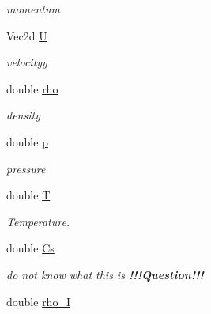 \begin{CompactItemize}
\begin{CompactList}\small\item\em momentum \item\end{CompactList}\item 
\hypertarget{classParticle_f931f3625b557b51cca6b199dc1f3e95}{
Vec2d \hyperlink{classParticle_f931f3625b557b51cca6b199dc1f3e95}{U}}
\label{classParticle_f931f3625b557b51cca6b199dc1f3e95}

\begin{CompactList}\small\item\em velocityy \item\end{CompactList}\item 
\hypertarget{classParticle_4a4fc6e753e74eac9d7725c431e94205}{
double \hyperlink{classParticle_4a4fc6e753e74eac9d7725c431e94205}{rho}}
\label{classParticle_4a4fc6e753e74eac9d7725c431e94205}

\begin{CompactList}\small\item\em density \item\end{CompactList}\item 
\hypertarget{classParticle_9ef797ea4feb5eed21755d5d8e99508e}{
double \hyperlink{classParticle_9ef797ea4feb5eed21755d5d8e99508e}{p}}
\label{classParticle_9ef797ea4feb5eed21755d5d8e99508e}

\begin{CompactList}\small\item\em pressure \item\end{CompactList}\item 
\hypertarget{classParticle_b07ac93118d84bc548e0dc837a5c31f5}{
double \hyperlink{classParticle_b07ac93118d84bc548e0dc837a5c31f5}{T}}
\label{classParticle_b07ac93118d84bc548e0dc837a5c31f5}

\begin{CompactList}\small\item\em Temperature. \item\end{CompactList}\item 
\hypertarget{classParticle_04aaaa78c93a52103d092923287d79ae}{
double \hyperlink{classParticle_04aaaa78c93a52103d092923287d79ae}{Cs}}
\label{classParticle_04aaaa78c93a52103d092923287d79ae}

\begin{CompactList}\small\item\em do not know what this is {\bf !!!Question!!!} \item\end{CompactList}\item 
\hypertarget{classParticle_c9af22c35c1bf1c33ae8145b0ec3a631}{
double \hyperlink{classParticle_c9af22c35c1bf1c33ae8145b0ec3a631}{rho\_\-I}}
\label{classParticle_c9af22c35c1bf1c33ae8145b0ec3a631}


\end{CompactItemize}
